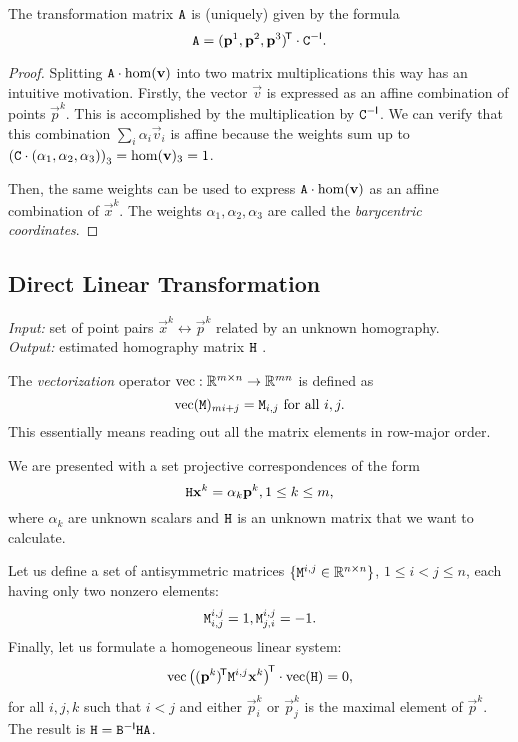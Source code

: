 \begin{lemma} \label{l:algo-aff}
The transformation matrix $\mathtt{A}$ is (uniquely) given by the formula
$$\mathtt{A} = (\mathbf{p}^1, \mathbf{p}^2, \mathbf{p}^3)^{\!\mathsf{T}} \cdot \mathtt{C} ^{-\mathsf{I}}.$$
\end{lemma}

\begin{proof}
Splitting $\mathtt{A} \cdot \mathrm{hom}(\mathbf{v})$ into two matrix multiplications this way has an intuitive motivation.
Firstly, the vector $\vec v$ is expressed as an affine combination of points $\vec p^k$.
This is accomplished by the multiplication by $\mathtt{C} ^{-\mathsf{I}}$.
We can verify that this combination $\sum_i \alpha_i \vec v_i$ is affine because the weights sum up to $\left(\mathtt{C} \cdot (\alpha_1, \alpha_2, \alpha_3) \right)_3 = \mathrm{hom}(\mathbf{v})_3 = 1$.

Then, the same weights can be used to express $\mathtt{A} \cdot \mathrm{hom}(\mathbf{v})$ as an affine combination of $\vec x^k$.
The weights $\alpha_1, \alpha_2, \alpha_3$ are called the \textit{barycentric coordinates}.
\end{proof}

\subsection{Direct Linear Transformation}

\textit{Input:} set of point pairs $\vec x^k \leftrightarrow \vec p^k$ related by an unknown homography.\\
\textit{Output:} estimated homography matrix $\mathtt{H}$ .\\

\begin{definition}
The \textit{vectorization} operator $\mathrm{vec} : \mathbb{R}^{m \times n} \to \mathbb{R}^{mn}$ is defined as
$$\mathrm{vec}(\mathtt{M})_{m i + j} = \mathtt{M}_{i,j} \textrm{ for all } i, j.$$
This essentially means reading out all the matrix elements in row-major order.
\end{definition}

We are presented with a set projective correspondences of the form
\begin{equation} \label{e:homography-input}
\mathtt{H} \mathbf{x}^k = \alpha_k \mathbf{p}^k, 1 \leq k \leq m,
\end{equation}
where $\alpha_k$ are unknown scalars and $\mathtt{H}$ is an unknown matrix that we want to calculate.

Let us define a set of antisymmetric matrices $\{\mathtt{M}^{i, j} \in \mathbb{R}^{n \times n}\}$, $1 \leq i < j \leq n$, each having only two nonzero elements:
\begin{equation} \label{e:homography-antisymm}
\mathtt{M}^{i, j}_{i, j} = 1,
\mathtt{M}^{i, j}_{j, i} = -1.
\end{equation}
Finally, let us formulate a homogeneous linear system:
\begin{equation} \label{e:homography-system}
\mathrm{vec} \left(({\mathbf{p}}^k)^{\!\mathsf{T}} \mathtt{M}^{i, j} {\mathbf{x}}^k \right)^{\!\mathsf{T}} \cdot \mathrm{vec}(\mathtt{H}) = 0,
\end{equation}
for all $i, j, k$ such that $i < j$ and either $\vec p^k_i$ or $\vec p^k_j$ is the maximal element of $\vec p^k$.
The result is $\mathtt{H} = \mathtt{B} ^{-\mathsf{I}} \mathtt{H} \mathtt{A}$.

